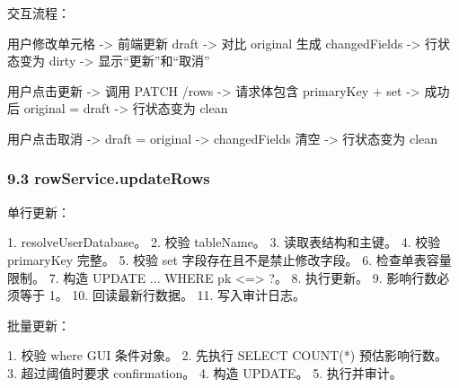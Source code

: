 \documentclass[
  a4paper,
  UTF8]{ctexart}
\newenvironment{Shaded}{}{}
\newcommand{\NormalTok}[1]{#1}
\begin{document}
交互流程：

\begin{Shaded}
\begin{Highlighting}[]
\NormalTok{用户修改单元格}
\NormalTok{  {-}\textgreater{} 前端更新 draft}
\NormalTok{  {-}\textgreater{} 对比 original 生成 changedFields}
\NormalTok{  {-}\textgreater{} 行状态变为 dirty}
\NormalTok{  {-}\textgreater{} 显示“更新”和“取消”}

\NormalTok{用户点击更新}
\NormalTok{  {-}\textgreater{} 调用 PATCH /rows}
\NormalTok{  {-}\textgreater{} 请求体包含 primaryKey + set}
\NormalTok{  {-}\textgreater{} 成功后 original = draft}
\NormalTok{  {-}\textgreater{} 行状态变为 clean}

\NormalTok{用户点击取消}
\NormalTok{  {-}\textgreater{} draft = original}
\NormalTok{  {-}\textgreater{} changedFields 清空}
\NormalTok{  {-}\textgreater{} 行状态变为 clean}
\end{Highlighting}
\end{Shaded}

\hypertarget{rowservice.updaterows}{%
\subsubsection{9.3 rowService.updateRows}\label{rowservice.updaterows}}

单行更新：

\begin{Shaded}
\begin{Highlighting}[]
\NormalTok{1. resolveUserDatabase。}
\NormalTok{2. 校验 tableName。}
\NormalTok{3. 读取表结构和主键。}
\NormalTok{4. 校验 primaryKey 完整。}
\NormalTok{5. 校验 set 字段存在且不是禁止修改字段。}
\NormalTok{6. 检查单表容量限制。}
\NormalTok{7. 构造 UPDATE ... WHERE pk \textless{}=\textgreater{} ?。}
\NormalTok{8. 执行更新。}
\NormalTok{9. 影响行数必须等于 1。}
\NormalTok{10. 回读最新行数据。}
\NormalTok{11. 写入审计日志。}
\end{Highlighting}
\end{Shaded}

批量更新：

\begin{Shaded}
\begin{Highlighting}[]
\NormalTok{1. 校验 where GUI 条件对象。}
\NormalTok{2. 先执行 SELECT COUNT(*) 预估影响行数。}
\NormalTok{3. 超过阈值时要求 confirmation。}
\NormalTok{4. 构造 UPDATE。}
\NormalTok{5. 执行并审计。}
\end{Highlighting}
\end{Shaded}
\end{document}
